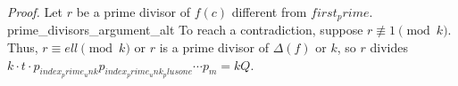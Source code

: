 \textit{Proof.} Let $r$ be a prime divisor of $f(c)$ different from ${first_prime}$. {prime_divisors_argument_alt} To reach a contradiction, suppose $r\not\equiv 1\pmod{{k}}$. Thus, $r\equiv {ell}\pmod{{k}}$ or $r$ is a prime divisor of $\Delta(f)$ or ${k}$, so $r$ divides ${k}\cdot t\cdot p_{{index_prime_unk}}p_{{index_prime_unk_plusone}}\cdots p_m={k}Q$.